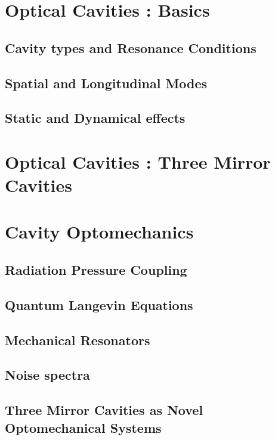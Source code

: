 \section{Optical Cavities : Basics}
\subsection{Cavity types and Resonance Conditions}
\subsection{Spatial and Longitudinal Modes}
\subsection{Static and Dynamical effects}
\hspace{1pt}

\section{\texorpdfstring{\color{red}Optical Cavities : Three Mirror Cavities}{Optical Cavities : Three Mirror Cavities}}
\subsection{}
\hspace{1pt}

\section{Cavity Optomechanics}
\subsection{Radiation Pressure Coupling}
\subsection{Quantum Langevin Equations}
\subsection{\texorpdfstring{Mechanical Resonators}{Mechanical Resonators}}
\subsection{Noise spectra}
\subsection{\texorpdfstring{\color{red} Three Mirror Cavities as Novel Optomechanical Systems}{Three Mirror Cavities as Novel Optomechanical Systems}}
\hspace{1pt}

